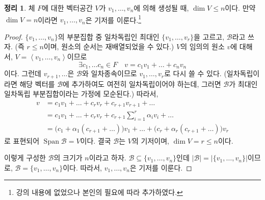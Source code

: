 \documentclass[unfonts,oneside,a4paper]{oblivoir}
\theoremstyle{definition}
\theoremstyle{theorem}
\newtheorem{theorem}{정리}[section]
\theoremstyle{theorem}
\theoremstyle{remark}
\theoremstyle{remark}
\theoremstyle{remark}
\theoremstyle{remark}
\renewcommand{\vec}[1]{\bm{\mathit{#1}}}
\DeclareMathOperator{\Span}{Span}
\begin{document}
\begin{theorem} \label{thm:basis_span}
    체 $F$에 대한 벡터공간 $V$가 $\vec v_1, \dots, \vec v_n$에 의해 생성될 때, $\dim V \leq n$이다.
    만약 $\dim V = n$이라면 $\vec v_1, \dots, \vec v_n$은 기저를 이룬다.\footnote{강의 내용에 없었으나 본인의 필요에 따라 추가하였다.}
\end{theorem}

\begin{proof}
    $\{\vec v_1, \dots, \vec v_n\}$의 부분집합 중 일차독립인 최대인 $\{\vec v_1, \dots, \vec v_r\}$을 고르고, $\mathcal B$라고 쓰자.
    (즉 $r \leq n$이며, 원소의 순서는 재배열되었을 수 있다.)
    $V$의 임의의 원소 $\vec v$에 대해서, $V = \left<\vec v_1, \dots, \vec v_n\right>$이므로
    \begin{equation*}
        \exists c_1, \dots c_n \in F \quad \vec v = c_1 \vec v_1 + \dots + c_n \vec v_n
    \end{equation*}
    이다.
    그런데 $\vec v_{r + 1}, \dots$은 $\mathcal B$와 일차종속이므로 $\vec v_1, \dots, \vec v_r$로 다시 쓸 수 있다.
    (일차독립이라면 해당 벡터를 $\mathcal B$에 추가하여도 여전히 일차독립이어야 하는데, 그러면 $\mathcal B$가 최대인 일차독립 부분집합이라는 가정에 모순된다.)
    따라서,
    \begin{align*}
        \vec v &= c_1 \vec v_1 + \dots + c_r \vec v_r + c_{r + 1} \vec v_{r + 1} + \dots\\
               &= c_1 \vec v_1 + \dots + c_r \vec v_r + c_{r + 1} \sum_{i = 1}^r \alpha_i \vec v_i + \dots\\
               &= \bigl(c_1 + \alpha_1 (c_{r + 1} + \dots)\bigr) \vec v_1 + \dots + \bigl(c_r + \alpha_r (c_{r + 1} + \dots)\bigr) \vec v_r
    \end{align*}
    로 표현되어 $\Span \mathcal B = V$이다.
    결국 $\mathcal B$는 $V$의 기저이며, $\dim V = r \leq n$이다.

    이렇게 구성한 $\mathcal B$의 크기가 $n$이라고 하자.
    $\mathcal B \subseteq \{\vec v_1, \dots, \vec v_n\}$인데 $|\mathcal B| = \bigl|\{\vec v_1, \dots, \vec v_n\}\bigr|$이므로, $\mathcal B = \{\vec v_1, \dots, \vec v_n\}$이다.
    따라서, $\vec v_1, \dots, \vec v_n$은 기저를 이룬다.
\end{proof}
\end{document}

